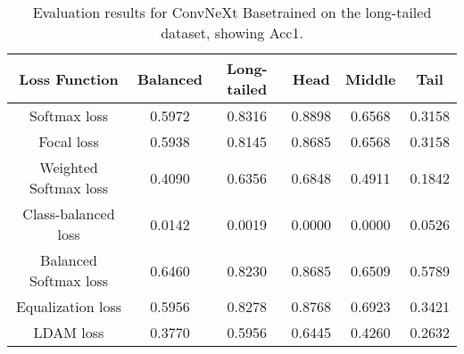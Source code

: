 \begin{table}[h!]
    \centering
    \begin{tabular}{cccccc}
        \toprule
        Loss Function & Balanced & Long-tailed & Head & Middle & Tail \\ 
        \midrule
        Softmax loss   & 0.5972 & 0.8316 & 0.8898 & 0.6568 & 0.3158 \\
        Focal loss   & 0.5938 & 0.8145 & 0.8685 & 0.6568 & 0.3158 \\
        Weighted Softmax loss   & 0.4090 & 0.6356 & 0.6848 & 0.4911 & 0.1842 \\
        Class-balanced loss   & 0.0142 & 0.0019 & 0.0000 & 0.0000 & 0.0526 \\
        Balanced Softmax loss   & 0.6460 & 0.8230 & 0.8685 & 0.6509 & 0.5789 \\
        Equalization loss   & 0.5956 & 0.8278 & 0.8768 & 0.6923 & 0.3421 \\
        LDAM loss   & 0.3770 & 0.5956 & 0.6445 & 0.4260 & 0.2632 \\
        \bottomrule
    \end{tabular}
    \caption{Evaluation results for ConvNeXt Basetrained on the long-tailed dataset, showing Acc1.}
    \label{tab:conv_lt_acc1}
\end{table}


